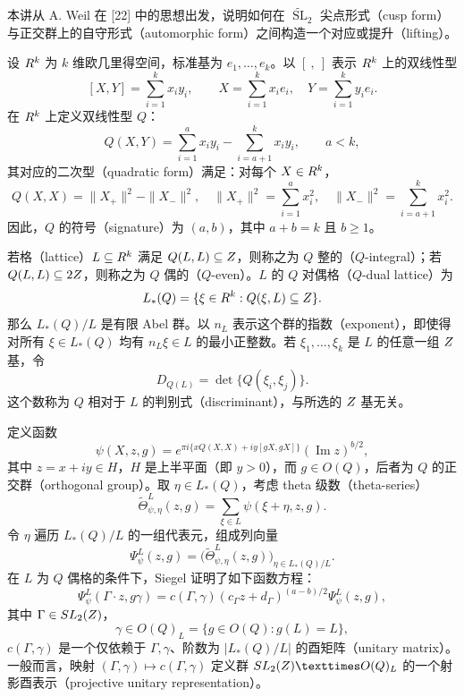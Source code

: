 
本讲从 A. Weil 在 [22] 中的思想出发，说明如何在 $\widetilde{\operatorname{SL}}_2$ 尖点形式（cusp form）与正交群上的自守形式（automorphic form）之间构造一个对应或提升（lifting）。

设 $R^k$ 为 $k$ 维欧几里得空间，标准基为 $e_1,\ldots,e_k$。以 $[\ ,\ ]$ 表示 $R^k$ 上的双线性型
\[
 [X,Y]=\sum_{i=1}^k x_i y_i,\qquad X=\sum_{i=1}^k x_i e_i,\quad Y=\sum_{i=1}^k y_i e_i.
\]
在 $R^k$ 上定义双线性型 $Q$：
\[
 Q(X,Y)=\sum_{i=1}^a x_i y_i-\sum_{i=a+1}^k x_i y_i,\qquad a<k,
\]
其对应的二次型（quadratic form）满足：对每个 $X\in R^k$，
\[
 Q(X,X)=\|X_+\|^2-\|X_-\|^2,\quad
 \|X_+\|^2=\sum_{i=1}^a x_i^2,\quad\|X_-\|^2=\sum_{i=a+1}^k x_i^2.
\]
因此，$Q$ 的符号（signature）为 $(a,b)$，其中 $a+b=k$ 且 $b\ge1$。

若格（lattice）$L\subseteq R^k$ 满足 $Q(L,L)\subseteq Z$，则称之为 $Q$ 整的（$Q$-integral）；若 $Q(L,L)\subseteq2Z$，则称之为 $Q$ 偶的（$Q$-even）。$L$ 的 $Q$ 对偶格（$Q$-dual lattice）为
\[
 L_*(Q)=\{\xi\in R^k:Q(\xi,L)\subseteq Z\}.
\]
那么 $L_*(Q)/L$ 是有限 Abel 群。以 $n_L$ 表示这个群的指数（exponent），即使得对所有 $\xi\in L_*(Q)$ 均有 $n_L\xi\in L$ 的最小正整数。若 $\xi_1,\ldots,\xi_k$ 是 $L$ 的任意一组 $Z$ 基，令
\[
 D_{Q(L)}=\det\{Q(\xi_i,\xi_j)\}.
\]
这个数称为 $Q$ 相对于 $L$ 的判别式（discriminant），与所选的 $Z$ 基无关。

定义函数
\begin{equation}
 \psi(X,z,g)=e^{\pi i\{xQ(X,X)+iy[gX,gX]\}}(\operatorname{Im}z)^{b/2},\tag{1-1}
\end{equation}
其中 $z=x+iy\in H$，$H$ 是上半平面（即 $y>0$），而 $g\in O(Q)$，后者为 $Q$ 的正交群（orthogonal group）。取 $\eta\in L_*(Q)$，考虑 theta 级数（theta-series）
\begin{equation}
 \widetilde\Theta_{\psi,\eta}^L(z,g)=\sum_{\xi\in L}\psi(\xi+\eta,z,g).\tag{1-2}
\end{equation}
令 $\eta$ 遍历 $L_*(Q)/L$ 的一组代表元，组成列向量
\begin{equation}
 \Psi_\psi^L(z,g)=\bigl(\widetilde\Theta_{\psi,\eta}^L(z,g)\bigr)_{\eta\in L_*(Q)/L}.\tag{1-3}
\end{equation}
在 $L$ 为 $Q$ 偶格的条件下，Siegel 证明了如下函数方程：
\begin{equation}
 \Psi_\psi^L(\Gamma\cdot z,g\gamma)
 =c(\Gamma,\gamma)(c_\Gamma z+d_\Gamma)^{(a-b)/2}\Psi_\psi^L(z,g),\tag{1-4}
\end{equation}
其中 $\Gamma\in SL_2(Z)$，
\[
 \gamma\in O(Q)_L=\{g\in O(Q):g(L)=L\},
\]
$c(\Gamma,\gamma)$ 是一个仅依赖于 $\Gamma,\gamma$、阶数为 $|L_*(Q)/L|$ 的酉矩阵（unitary matrix）。一般而言，映射 $(\Gamma,\gamma)\mapsto c(\Gamma,\gamma)$ 定义群 $\widetilde{\operatorname{SL}}_2(\Z)\times O(Q)_L$ 的一个射影酉表示（projective unitary representation）。

